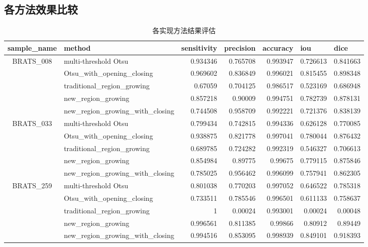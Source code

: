 \documentclass[UTF8]{ctexart}
\begin{document}
\subsection{各方法效果比较}
\begin{table}[H]
    \centering
    \caption{各实现方法结果评估}
      \begin{tabular}{clrrrrr}
        \toprule
      \multicolumn{1}{l}{sample\_name} & method & \multicolumn{1}{l}{sensitivity} & \multicolumn{1}{l}{precision} & \multicolumn{1}{l}{accuracy} & \multicolumn{1}{l}{iou} & \multicolumn{1}{l}{dice} \\
      \midrule
      \multirow{5}[0]{*}{BRATS\_008} & multi-threshold Otsu & 0.934346 & 0.765708 & 0.993947 & 0.726613 & 0.841663 \\
            & Otsu\_with\_opening\_closing & 0.969602 & 0.836849 & 0.996021 & 0.815455 & 0.898348 \\
            & traditional\_region\_growing & 0.67059 & 0.704125 & 0.986517 & 0.523169 & 0.686948 \\
            & new\_region\_growing & 0.857218 & 0.90009 & 0.994751 & 0.782739 & 0.878131 \\
            & new\_region\_growing\_with\_closing & 0.744508 & 0.958709 & 0.992221 & 0.721376 & 0.838139 \\
      \multirow{5}[0]{*}{BRATS\_033} & multi-threshold Otsu & 0.799434 & 0.742815 & 0.994336 & 0.626128 & 0.770085 \\
            & Otsu\_with\_opening\_closing & 0.938875 & 0.821778 & 0.997041 & 0.780044 & 0.876432 \\
            & traditional\_region\_growing & 0.689785 & 0.724282 & 0.992319 & 0.546327 & 0.706613 \\
            & new\_region\_growing & 0.854984 & 0.89775 & 0.99675 & 0.779115 & 0.875846 \\
            & new\_region\_growing\_with\_closing & 0.785025 & 0.956462 & 0.996099 & 0.757941 & 0.862305 \\
      \multirow{5}[0]{*}{BRATS\_259} & multi-threshold Otsu & 0.801038 & 0.770203 & 0.997052 & 0.646522 & 0.785318 \\
            & Otsu\_with\_opening\_closing & 0.733511 & 0.785546 & 0.996501 & 0.611133 & 0.758637 \\
            & traditional\_region\_growing & 1     & 0.00024 & 0.993001 & 0.00024 & 0.00048 \\
            & new\_region\_growing & 0.996561 & 0.811385 & 0.99866 & 0.80912 & 0.89449 \\
            & new\_region\_growing\_with\_closing & 0.994516 & 0.853095 & 0.998939 & 0.849101 & 0.918393 \\
            \bottomrule
      \end{tabular}%
    \label{tab:addlabel}%
  \end{table}%
  
\end{document}
